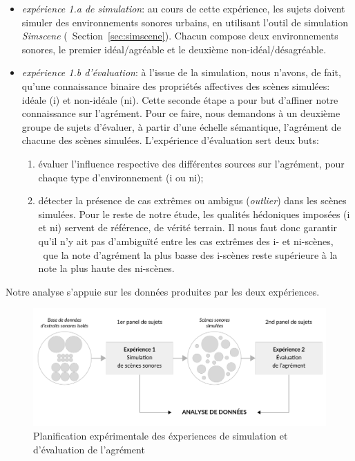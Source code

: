 \documentclass[twoside,twocolumn]{article}
\begin{document}
\begin{itemize}
\item \emph{expérience 1.a de simulation}: au cours de cette expérience, les sujets doivent simuler des environnements sonores urbains, en utilisant l'outil de simulation \emph{Simscene} (\cf~Section~\ref{sec:simscene}). Chacun compose deux environnements sonores, le premier idéal/agréable et le deuxième non-idéal/désagréable.

\item \emph{expérience 1.b d'évaluation}: à l'issue de la simulation, nous n'avons, de fait, qu'une connaissance binaire des propriétés affectives des scènes simulées: idéale (i) et non-idéale (ni). Cette seconde étape a pour but d'affiner notre connaissance sur l'agrément. Pour ce faire, nous demandons à un deuxième groupe de sujets d'évaluer, à partir d'une échelle sémantique, l'agrément de chacune des scènes simulées. L'expérience d'évaluation sert deux buts:

\begin{enumerate}
\item évaluer l'influence respective des différentes sources sur l'agrément, pour chaque type d'environnement (i ou ni);
\item détecter la présence de cas extrêmes ou ambigus (\emph{outlier}) dans les scènes simulées. Pour le reste de notre étude, les qualités hédoniques imposées (i et ni) servent de référence, de vérité terrain. Il nous faut donc garantir qu'il n'y ait pas d’ambiguïté entre les cas extrêmes des i- et ni-scènes, \ie~que la note d'agrément la plus basse des i-scènes reste supérieure à la note la plus haute des ni-scènes.
\end{enumerate}

\end{itemize}

Notre analyse s'appuie sur les données produites par les deux expériences.

\begin{figure}[t]
        \myfloatalign
        \includegraphics[width=\linewidth]{gfx/ch_5/5}
        \caption{Planification expérimentale des éxperiences de simulation et d'évaluation de l'agrément}\label{fig:xp1_2}
\end{figure}
\end{document}
